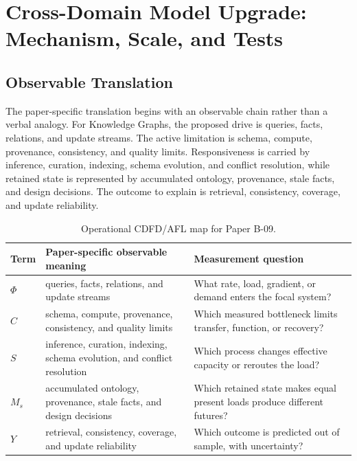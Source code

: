\documentclass[11pt,a4paper]{article}
\begin{document}
\section{Cross-Domain Model Upgrade: Mechanism, Scale, and Tests}

\subsection{Observable Translation}

The paper-specific translation begins with an observable chain rather than a
verbal analogy. For Knowledge Graphs, the proposed drive is queries, facts, relations, and update streams.
The active limitation is schema, compute, provenance, consistency, and quality limits. Responsiveness is carried by
inference, curation, indexing, schema evolution, and conflict resolution, while retained state is represented by
accumulated ontology, provenance, stale facts, and design decisions. The outcome to explain is retrieval, consistency, coverage, and update reliability.

\begin{table}[htbp]
\centering
\small
\caption{Operational CDFD/AFL map for Paper B-09.}
\begin{tabularx}{\textwidth}{|l|X|X|}
\hline
\textbf{Term} & \textbf{Paper-specific observable meaning} & \textbf{Measurement question} \\
\hline
$\Phi$ & queries, facts, relations, and update streams & What rate, load, gradient, or demand enters the focal system? \\
\hline
$C$ & schema, compute, provenance, consistency, and quality limits & Which measured bottleneck limits transfer, function, or recovery? \\
\hline
$S$ & inference, curation, indexing, schema evolution, and conflict resolution & Which process changes effective capacity or reroutes the load? \\
\hline
$M_s$ & accumulated ontology, provenance, stale facts, and design decisions & Which retained state makes equal present loads produce different futures? \\
\hline
$Y$ & retrieval, consistency, coverage, and update reliability & Which outcome is predicted out of sample, with uncertainty? \\
\hline
\end{tabularx}
\end{table}
\end{document}
